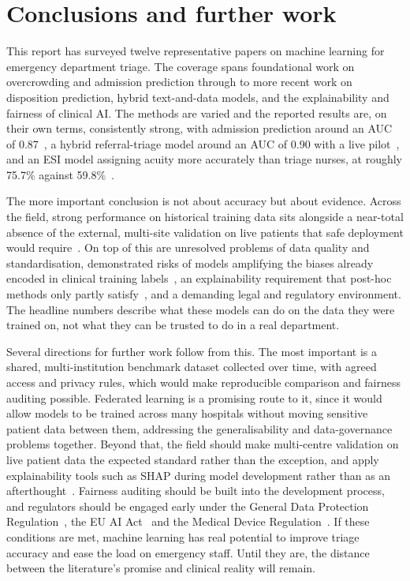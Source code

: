 \documentclass[11pt]{article}
\begin{document}
\section{Conclusions and further work}
\label{sec:conclusion}

This report has surveyed twelve representative papers on machine learning for emergency department triage. The coverage spans foundational work on overcrowding and admission prediction through to more recent work on disposition prediction, hybrid text-and-data models, and the explainability and fairness of clinical AI. The methods are varied and the reported results are, on their own terms, consistently strong, with admission prediction around an AUC of 0.87~\cite{Hong2018PredictingHA}, a hybrid referral-triage model around an AUC of 0.90 with a live pilot~\cite{Wang2023}, and an ESI model assigning acuity more accurately than triage nurses, at roughly 75.7\% against 59.8\%~\cite{Ivanov2021}.

The more important conclusion is not about accuracy but about evidence. Across the field, strong performance on historical training data sits alongside a near-total absence of the external, multi-site validation on live patients that safe deployment would require~\cite{Sanchez2022, Fernandes}. On top of this are unresolved problems of data quality and standardisation, demonstrated risks of models amplifying the biases already encoded in clinical training labels~\cite{SeyyedKalantari2021}, an explainability requirement that post-hoc methods only partly satisfy~\cite{Antoniadi}, and a demanding legal and regulatory environment. The headline numbers describe what these models can do on the data they were trained on, not what they can be trusted to do in a real department.

Several directions for further work follow from this. The most important is a shared, multi-institution benchmark dataset collected over time, with agreed access and privacy rules, which would make reproducible comparison and fairness auditing possible. Federated learning is a promising route to it, since it would allow models to be trained across many hospitals without moving sensitive patient data between them, addressing the generalisability and data-governance problems together. Beyond that, the field should make multi-centre validation on live patient data the expected standard rather than the exception, and apply explainability tools such as SHAP during model development rather than as an afterthought~\cite{Antoniadi}. Fairness auditing should be built into the development process, and regulators should be engaged early under the General Data Protection Regulation~\cite{GDPR}, the EU AI Act~\cite{AIAct} and the Medical Device Regulation~\cite{MDR}. If these conditions are met, machine learning has real potential to improve triage accuracy and ease the load on emergency staff. Until they are, the distance between the literature's promise and clinical reality will remain.
\end{document}
